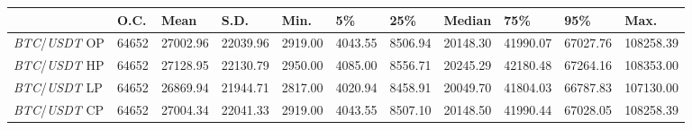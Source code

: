 \begin{tabular}{lllllllllll}
\toprule
 & \textbf{O.C.} & \textbf{Mean} & \textbf{S.D.} & \textbf{Min.} & \textbf{5\%} & \textbf{25\%} & \textbf{Median} & \textbf{75\%} & \textbf{95\%} & \textbf{Max.} \\
\midrule
\emph{BTC}/\emph{USDT} OP & 64652 & 27002.96 & 22039.96 & 2919.00 & 4043.55 & 8506.94 & 20148.30 & 41990.07 & 67027.76 & 108258.39 \\
\emph{BTC}/\emph{USDT} HP & 64652 & 27128.95 & 22130.79 & 2950.00 & 4085.00 & 8556.71 & 20245.29 & 42180.48 & 67264.16 & 108353.00 \\
\emph{BTC}/\emph{USDT} LP & 64652 & 26869.94 & 21944.71 & 2817.00 & 4020.94 & 8458.91 & 20049.70 & 41804.03 & 66787.83 & 107130.00 \\
\emph{BTC}/\emph{USDT} CP & 64652 & 27004.34 & 22041.33 & 2919.00 & 4043.55 & 8507.10 & 20148.50 & 41990.44 & 67028.05 & 108258.39 \\
\bottomrule
\end{tabular}
